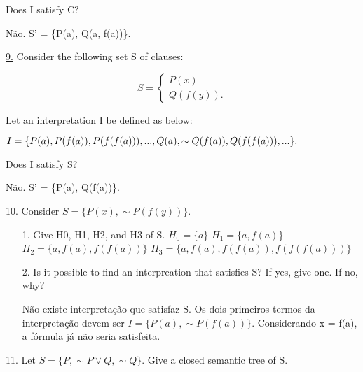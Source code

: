 Does I satisfy C?

Não. S' = \{P(a), Q(a, f(a))\}.

\underline{9.} Consider the following set S of clauses:

\[
S =	\begin{cases}
		P(x) \\
		Q(f(y)).
	\end{cases}
\]

Let an interpretation I be defined as below:

$I =\\
\{P(a), P(f(a)), P(f(f(a))), ...,\\
Q(a), \sim Q(f(a)), Q(f(f(a))), ...\}.
$

Does I satisfy S?

Não. S' = \{P(a), Q(f(a))\}.

10. Consider $ S = \{P(x), \sim P(f(y))\} $.

\begin{itemize}
 \item[1.] Give H0, H1, H2, and H3 of S. \newline
$ H_0 = \{a\} $ \newline
$ H_1 = \{a, f(a)\} $ \newline
$ H_2 = \{a, f(a), f(f(a))\} $ \newline
$ H_3 = \{a, f(a), f(f(a)), f(f(f(a)))\} $
 \item[2.] Is it possible to find an interpreation that satisfies S? If yes, give one. If no, why?

Não existe interpretação que satisfaz S. Os dois primeiros termos da interpretação devem ser $I = \{ P(a), \sim P(f(a)) \}$. Considerando x = f(a), a fórmula já não seria satisfeita.
\end{itemize}

11. Let $ S = \{P, \sim P \vee Q, \sim Q\} $. Give a closed semantic tree of S.


